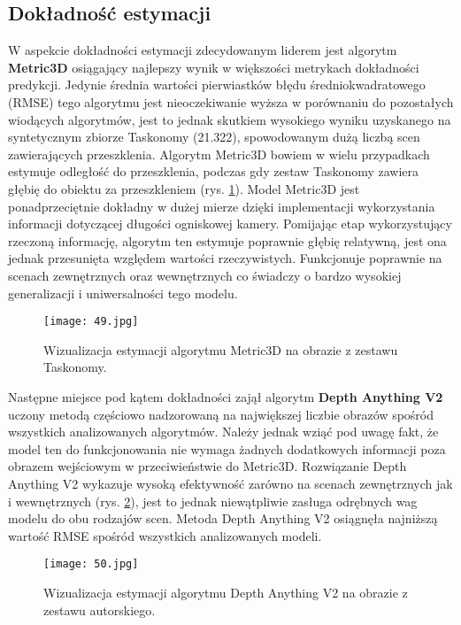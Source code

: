 \subsection{Dokładność estymacji}
W aspekcie dokładności estymacji zdecydowanym liderem jest algorytm \textbf{Metric3D} osiągający najlepszy wynik w większości metrykach dokładności predykcji. Jedynie średnia wartości pierwiastków błędu średniokwadratowego (RMSE) tego algorytmu jest nieoczekiwanie wyższa w porównaniu do pozostałych wiodących algorytmów, jest to jednak skutkiem wysokiego wyniku uzyskanego na syntetycznym zbiorze Taskonomy (21.322), spowodowanym dużą liczbą scen zawierających przeszklenia. Algorytm Metric3D bowiem w wielu przypadkach estymuje odległość do przeszklenia, podczas gdy zestaw Taskonomy zawiera głębię do obiektu za przeszkleniem (rys. \ref{fig:metric3d-taskonomy}). Model Metric3D jest ponadprzeciętnie dokładny w dużej mierze dzięki implementacji wykorzystania informacji dotyczącej długości ogniskowej kamery. Pomijając etap wykorzystujący rzeczoną informację, algorytm ten estymuje poprawnie głębię relatywną, jest ona jednak przesunięta względem wartości rzeczywistych. Funkcjonuje poprawnie na scenach zewnętrznych oraz wewnętrznych co świadczy o bardzo wysokiej generalizacji i uniwersalności tego modelu.
\begin{figure}[H]
    \centering
    \texttt{[image: 49.jpg]}
    \caption{Wizualizacja estymacji algorytmu Metric3D na obrazie z zestawu Taskonomy.}
    \label{fig:metric3d-taskonomy}
\end{figure}

Następne miejsce pod kątem dokładności zajął algorytm \textbf{Depth Anything V2} uczony metodą częściowo nadzorowaną na największej liczbie obrazów spośród wszystkich analizowanych algorytmów. Należy jednak wziąć pod uwagę fakt, że model ten do funkcjonowania nie wymaga żadnych dodatkowych informacji poza obrazem wejściowym w przeciwieństwie do Metric3D. Rozwiązanie Depth Anything V2 wykazuje wysoką efektywność zarówno na scenach zewnętrznych jak i wewnętrznych (rys. \ref{fig:depthanything-stray}), jest to jednak niewątpliwie zasługa odrębnych wag modelu do obu rodzajów scen. Metoda Depth Anything V2 osiągnęła najniższą wartość RMSE spośród wszystkich analizowanych modeli.
\begin{figure}[H]
    \centering
    \texttt{[image: 50.jpg]}
    \caption{Wizualizacja estymacji algorytmu Depth Anything V2 na obrazie z zestawu autorskiego.}
    \label{fig:depthanything-stray}
\end{figure}

